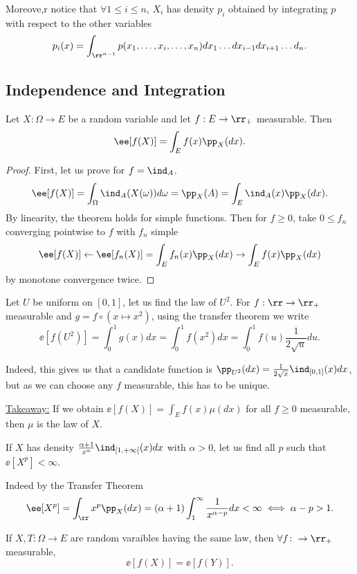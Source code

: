 \documentclass[../main.tex]{subfiles}
\begin{document}
Moreove,r notice that $\forall 1 \leq i \leq n$, $X_i$ has density
$p_i$ obtained by integrating $p$ with respect to the other variables
\[
  p_i(x) = \int_{\rr^{n-1}} p(x_1, \ldots, x_i, \ldots, x_n)dx_1
  \ldots dx_{i-1} dx_{i+1} \ldots d_n
.\] 

\subsection{Independence and Integration}
\begin{theorem}
  Let $X \colon \Omega \to E$ be a random variable and let $f: E \to
  \rr_+$ measurable. Then
  \[
    \ee[f(X)] = \int_{E}f(x)\pp_X(dx)
  .\] 
\end{theorem}
\begin{proof}
    First, let us prove for $f = \ind_A$.
    \[
      \ee[f(X)] = \int_{\Omega} \ind_A(X(\omega)) d\omega = \pp_X(A) =
      \int_{E} \ind_A(x)\pp_X(dx)
    .\] 
  By linearity, the theorem holds for simple functions. Then for $f
  \geq 0$, take $0 \leq f_n $ converging pointwise to $f$ with $f_n$
  simple
  \[
    \ee[f(X)] \gets \ee[f_n(X)] = \int_{E}f_n(x)\pp_{X}(dx) \to \int_E
    f(x) \pp_X(dx)
  \]
  by monotone convergence twice.
\end{proof}

\begin{application}
  Let $U$ be uniform on $[0, 1]$, let us find the law of $U^2$. For
  $f: \rr \to \rr_+$ measurable and $g = f \circ (x \mapsto x^2)$, 
  using the transfer theorem we write
  \[
    \ee[f(U^2)] = \int_{0}^1 g(x)dx = \int_{0}^1 f(x^2)dx = \int_{0}^1
    f(u) \frac{1}{2\sqrt{u}}du 
  .\] 

  Indeed, this gives us that a candidate function is
  $\pp_{U^2}(dx) = \frac{1}{2\sqrt{x}}\ind_{[0,1]}(x)dx $, but as we
  can choose any $f$ measurable, this has to be unique.
\end{application}

\underline{\sffamily Takeaway:} If we obtain $\ee[f(X)] = \int_{E}f(x)
\mu(dx)$ for all $f \geq 0$ measurable, then $\mu$ is the law of $X$.

\begin{example}
  If $X$ has density $\frac{\alpha + 1}{x^{\alpha}} \ind_{[1,
  +\infty[}(x)dx $ with $\alpha > 0$, let us find all $p$ such that
  $\ee[X^p] < \infty$.

  \vspace{0.3em}

  \noindent Indeed by the Transfer Theorem
  \[
    \ee[X^p] = \int_{\rr} x^p \pp_X(dx) = (\alpha + 1) \int_{1}^\infty
    \frac{1}{x^{\alpha - p}}dx < \infty \iff \alpha - p > 1
  .\] 
\end{example}

\begin{corollary}
    If $X, T \colon \Omega \to E$ are random varaibles having the same
    law, then $\forall f \colon \to \rr_{+}$ measurable,
    \[
      \ee[f(X)] = \ee[f(Y)]
    .\] 
\end{corollary}
\end{document}

